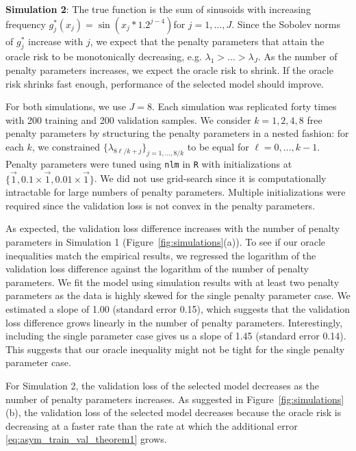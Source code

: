 \documentclass[12pt]{article} %
\theoremstyle{definition}
\begin{document}
\noindent \textbf{Simulation 2}: The true function is the sum of sinusoids with increasing frequency
$g_j^*(x_j) = \sin(x_j * 1.2^{j - 4})$for $j = 1,...,J$.
Since the Sobolev norms of $g_j^*$ increase with $j$, we expect that the penalty parameters that attain the oracle risk to be monotonically decreasing, e.g. ${\lambda}_1 > ... > {\lambda}_J$. 
As the number of penalty parameters increases, we expect the oracle risk to shrink.
If the oracle risk shrinks fast enough, performance of the selected model should improve.

For both simulations, we use $J = 8$.
Each simulation was replicated forty times with 200 training and 200 validation samples.
We consider $k = 1, 2, 4, 8$ free penalty parameters by structuring the penalty parameters in a nested fashion: for each $k$, we constrained $\{\lambda_{8\ell/k + j} \}_{j = 1,...,8/k}$ to be equal for $\ell= 0,...,k - 1$.
Penalty parameters were tuned using \texttt{nlm} in \texttt{R} with initializations at $\{\vec{1}, 0.1 \times \vec{1}, 0.01 \times \vec{1}\}$. 
We did not use grid-search since it is computationally intractable for large numbers of penalty parameters.
Multiple initializations were required since the validation loss is not convex in the penalty parameters.

As expected, the validation loss difference increases with the number of penalty parameters in Simulation 1 (Figure~\ref{fig:simulations}(a)).
To see if our oracle inequalities match the empirical results, we regressed the logarithm of the validation loss difference against the logarithm of the number of penalty parameters.
We fit the model using simulation results with at least two penalty parameters as the data is highly skewed for the single penalty parameter case.
We estimated a slope of 1.00 (standard error 0.15), which suggests that the validation loss difference grows linearly in the number of penalty parameters.
Interestingly, including the single parameter case gives us a slope of 1.45 (standard error 0.14).
This suggests that our oracle inequality might not be tight for the single penalty parameter case.

For Simulation 2, the validation loss of the selected model decreases as the number of penalty parameters increases.
As suggested in Figure~\ref{fig:simulations}(b), the validation loss of the selected model decreases because the oracle risk is decreasing at a faster rate than the rate at which the additional error \eqref{eq:asym_train_val_theorem1} grows.
\end{document}

